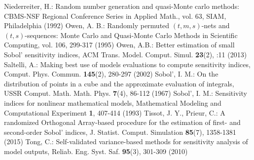 \begin{thebibliography}{99}
Niederreiter, H.: Random number generation and quasi-Monte carlo methods: CBMS-NSF Regional Conference Series in Applied Math., vol. 63, SIAM, Philadelphia (1992)
Owen, A. B.: Randomly permuted $(t,m,s)$-nets and $(t,s)$-sequences: Monte Carlo and Quasi-Monte Carlo Methods in Scientific Computing, vol. 106, 299-317 (1995)
Owen, A.B.: Better estimation of small Sobol' sensitivity indices, ACM Trans. Model. Comput. Simul. \textbf{23}(2), :11 (2013)
Saltelli, A.: Making best use of models evaluations to compute sensitivity indices, Comput. Phys. Commun. \textbf{145}(2), 280-297 (2002)
Sobol', I. M.: On the distribution of points in a cube and the approximate evaluation of integrals, USSR Comput. Math. Math. Phys. \textbf{7}(4), 86-112 (1967)
Sobol', I. M.: Sensitivity indices for nonlinear mathematical models, Mathematical Modeling and Computational Experiment \textbf{1}, 407-414 (1993)
Tissot, J. Y., Prieur, C.: A randomized Orthogonal Array-based procedure for the estimation of first- and second-order Sobol' indices, J. Statist. Comput. Simulation \textbf{85}(7), 1358-1381 (2015)
Tong, C.: Self-validated variance-based methods for sensitivity analysis of model outputs, Reliab. Eng. Syst. Saf. \textbf{95}(3), 301-309 (2010)

\end{thebibliography}

